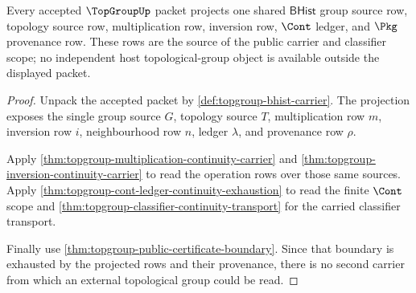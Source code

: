 \begin{theorem}
\label{thm:topgroup-source-coupled-carrier-scope}
Every accepted $\TopGroupUp$ packet projects one shared $\mathsf{BHist}$ group
source row, topology source row, multiplication row, inversion row, $\Cont$
ledger, and $\Pkg$ provenance row. These rows are the source of the public
carrier and classifier scope; no independent host topological-group object is
available outside the displayed packet.
\end{theorem}
\begin{proof}
Unpack the accepted packet by \autoref{def:topgroup-bhist-carrier}. The
projection exposes the single group source $G$, topology source $T$,
multiplication row $m$, inversion row $i$, neighbourhood row $n$, ledger
$\lambda$, and provenance row $\rho$.

Apply \autoref{thm:topgroup-multiplication-continuity-carrier} and
\autoref{thm:topgroup-inversion-continuity-carrier} to read the operation
rows over those same sources. Apply
\autoref{thm:topgroup-cont-ledger-continuity-exhaustion} to read the finite
$\Cont$ scope and
\autoref{thm:topgroup-classifier-continuity-transport} for the carried
classifier transport.

Finally use \autoref{thm:topgroup-public-certificate-boundary}. Since that
boundary is exhausted by the projected rows and their provenance, there is no
second carrier from which an external topological group could be read.
\end{proof}

